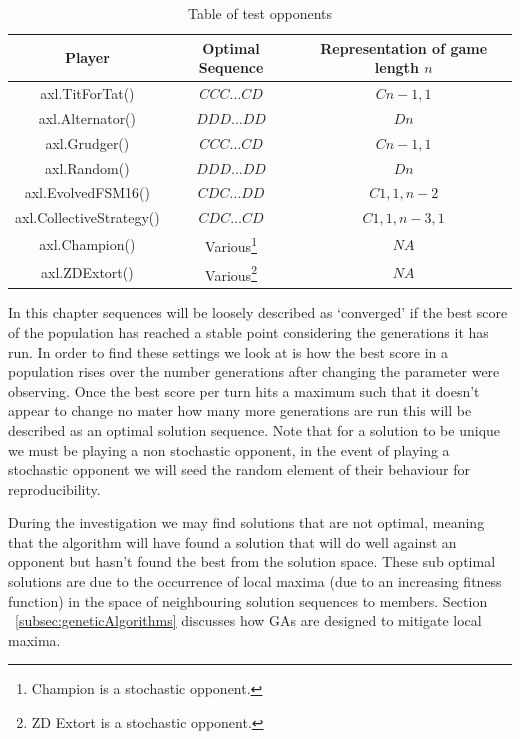 \begin{table}
    \centering
    \begin{tabular}{ccc}
        \toprule
        Player & Optimal Sequence & Representation of game length $n$\\
        \midrule
        axl.TitForTat()&\(CCC\ldots CD\)& $Cn-1,1$\\
        axl.Alternator()&\(DDD\ldots DD\)&$Dn$\\
        axl.Grudger()&\(CCC\ldots CD\)&$Cn-1,1$\\
        axl.Random()&\(DDD\ldots DD\)&$Dn$\\
        axl.EvolvedFSM16()& $CDC\ldots DD$ & $C1,1,n-2$\\
        axl.CollectiveStrategy()&$CDC\ldots CD$&$C1,1,n-3,1$\\
        axl.Champion()& Various\footnote{Champion is a stochastic opponent.} & $NA$\\
        axl.ZDExtort()& Various\footnote{ZD Extort is a stochastic opponent.} & $NA$\\
        \bottomrule
    \end{tabular}
    \caption{Table of test opponents}\label{table:table_test_opsponents}
\end{table}

In this chapter sequences will be loosely described as `converged' if the best score of the population has reached a stable point considering the generations it has run.
In order to find these settings we look at is how the best score in a population rises over the number generations after changing the parameter were observing.
Once the best score per turn hits a maximum such that it doesn't appear to change no mater how many more generations are run this will be described as an optimal solution sequence.
Note that for a solution to be unique we must be playing a non stochastic opponent, in the event of playing a  stochastic opponent we will seed the random element of their behaviour for reproducibility.

During the investigation we may find solutions that are not optimal, meaning that the algorithm will have found a solution that will do well against an opponent but hasn't found the best from the solution space.
These sub optimal solutions are due to the occurrence of local maxima (due to an increasing fitness function) in the space of neighbouring solution sequences to members.
Section ~\ref{subsec:geneticAlgorithms} discusses how GAs are designed to mitigate local maxima.

